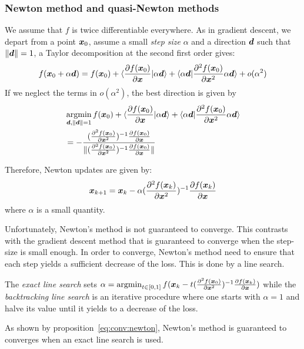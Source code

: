 \subsubsection{Newton method and quasi-Newton methods}
\label{sec:qn}
We assume that $f$ is twice differentiable everywhere.
As in gradient descent, we depart from a point $\xb_0$, assume a small \emph{step size} $\alpha$ and a direction
$\db$ such that $\|\db\| = 1$, a Taylor decomposition at the second first order gives:
\begin{align}
  f(\xb_0 + \alpha \db) = f(\xb_0) + \langle \partialfrac{\xb}{f(\xb_0)} | \alpha \db \rangle + \langle \alpha \db | \partialfrac{\xb^2}{^2 f(\xb_0)} \alpha \db \rangle + o(\alpha^2) 
\end{align}
If we neglect the terms in $o(\alpha^2)$, the best direction is given by
\begin{align}
  &\argmin_{\db, \|\db\| = 1} f(\xb_0) + \langle \partialfrac{\xb}{f(\xb_0)} | \alpha \db \rangle + \langle \alpha \db | \partialfrac{\xb^2}{^2 f(\xb_0)} \alpha \db \rangle \\
  &= - \frac{(\partialfrac{\xb^2}{^2 f(\xb_0)})^{-1}\partialfrac{\xb}{f(\xb_0)}}{\| (\partialfrac{\xb^2}{^2 f(\xb_0)})^{-1} \partialfrac{\xb}{f(\xb_0)}\|}
\end{align}


Therefore, Newton updates are given by:
\begin{align}
  \xb_{k+1} = \xb_k -\alpha (\partialfrac{\xb^2}{^2 f(\xb_k)})^{-1} \partialfrac{\xb}{f(\xb_k)} \label{eq:update:newton}
\end{align}
where $\alpha$ is a small quantity.

Unfortunately, Newton's method is not guaranteed to converge. This contrasts with the gradient descent method that is guaranteed to converge when the step-size is small enough.
In order to converge, Newton's method need to ensure that each step yields a sufficient decrease of the loss. This is done by a line search.

The \emph{exact line search} sets $\alpha = \argmin_{t \in [0, 1]} f(\xb_k - t
(\partialfrac{\xb^2}{^2 f(\xb_0)})^{-1} \partialfrac{\xb}{f(\xb_k)})$ while the \emph{backtracking line search} is an iterative procedure where one starts with $\alpha=1$ and halve its value until it yields to a decrease of the loss.

As shown by proposition~\ref{eq:conv:newton}, Newton's method is guaranteed to converges when an
exact line search is used.

